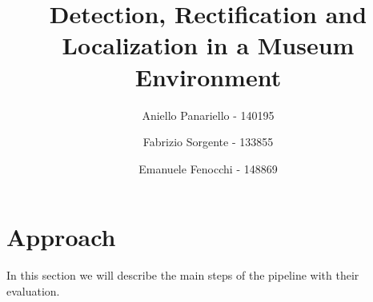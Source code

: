 \documentclass[11pt,oneside,a4paper,twocolumn]{article}
\title{Detection, Rectification and Localization in a Museum Environment}
\author{Aniello Panariello - 140195}
\author{Fabrizio Sorgente - 133855}
\author{Emanuele Fenocchi - 148869}
\affil{University of Modena and Reggio Emilia}
\begin{document}
\maketitle



\section{Approach}
In this section we will describe the main steps of the pipeline with their evaluation.








\printbibliography[heading=bibintoc,title={Bibliography}]\thispagestyle{empty}



%     
\onecolumn
\thispagestyle{empty}

\end{document}
